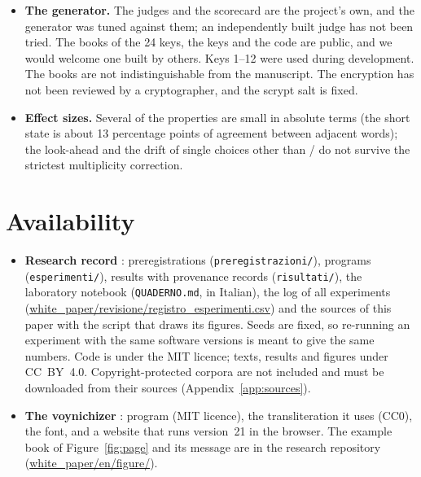 \begin{itemize}
  different choices change at the same points, and whether the short state crosses the line break. Whether the state
  survives the gap of a drawing is undecided for lack of data.
\item \textbf{The generator.} The judges and the scorecard are the project's own, and the generator was tuned against
  them; an independently built judge has not been tried. The books of the 24 keys, the keys and the code are public,
  and we would welcome one built by others. Keys 1--12 were used during development. The books are not
  indistinguishable from the manuscript. The encryption has not been reviewed by a cryptographer, and the scrypt salt is
  fixed.
\item \textbf{Effect sizes.} Several of the properties are small in absolute terms (the short state is about 13
  percentage points of agreement between adjacent words); the look-ahead and the drift of single choices other than
  / do not survive the strictest multiplicity correction.
\end{itemize}

\section{Availability}

\begin{itemize}
\item \textbf{Research record} \citep{repository}: preregistrations (\texttt{preregistrazioni/}), programs
  (\texttt{esperimenti/}), results with provenance records (\texttt{risultati/}), the laboratory notebook
  (\texttt{QUADERNO.md}, in Italian), the log of all experiments (\url{white_paper/revisione/registro_esperimenti.csv})
  and the sources of this paper with the script that draws its figures. Seeds are fixed, so re-running an experiment
  with the same software versions is meant to give the same numbers. Code is under the MIT licence; texts, results and
  figures under CC~BY~4.0.
  Copyright-protected corpora are not included and must be downloaded from their sources (Appendix~\ref{app:sources}).
\item \textbf{The voynichizer} \citep{voynichizer}: program (MIT licence), the transliteration it uses (CC0), the font, and
  a website that runs version~21 in the browser. The example book of Figure~\ref{fig:page} and its message are in the
  research repository (\url{white_paper/en/figure/}).
\end{itemize}
